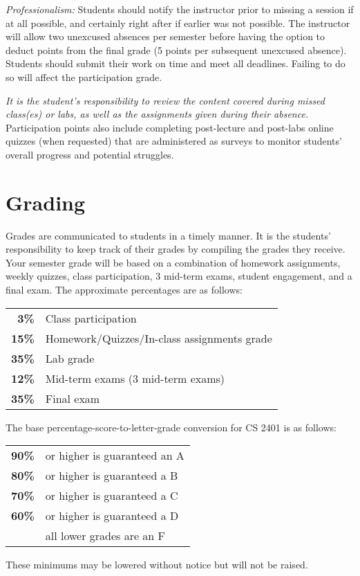 \documentclass[12pt]{scrartcl}
\newcommand{\change}[2]{#2}
\begin{document}
\textit{Professionalism:} 
Students should notify the instructor prior to missing a session if at all possible, and certainly right after if earlier was not possible. 
The instructor will allow two unexcused absences per semester before having the option to deduct points from the final grade (5 points per subsequent unexcused absence). 
Students should submit their work on time and meet all deadlines. Failing to do so will affect the participation grade.

\textit{It is the student's responsibility to \change{obtain}{review} the content covered during missed class(es) or labs, as well as the assignments given during their absence.} 
Participation points also include completing post-lecture and post-labs online quizzes (when requested) that are administered as surveys to monitor students’ overall progress and potential struggles.


\section{Grading}

Grades are communicated to students in a timely manner. 
It is the students’ responsibility to keep track of their grades by compiling the grades they receive. 
Your semester grade will be based on a combination of homework assignments, weekly quizzes, class participation, 3 mid-term exams, student engagement, and a final exam. 
The approximate percentages are as follows:
\begin{center}
\begin{tabular}{rl}
\textbf{3\% } & Class participation \\
\textbf{15\% } & Homework/Quizzes/In-class assignments grade\\
\textbf{35\% } & Lab grade\\
\textbf{12\% } & Mid-term exams (3 mid-term exams) \\
\textbf{35\% } & Final exam\\
\end{tabular}
\end{center}
The base percentage-score-to-letter-grade conversion for CS 2401 is as follows: 
\change{}{
\begin{center}
\begin{tabular}{rl}
\textbf{90\%}& or higher is guaranteed an A \\
\textbf{80\%}& or higher is guaranteed a B \\
\textbf{70\%}& or higher is guaranteed a C \\
\textbf{60\%}& or higher is guaranteed a D \\
\textbf{}& all lower grades are an F 
\end{tabular}
\end{center}
These minimums may be lowered without notice but will not be raised. 
}
\end{document}

